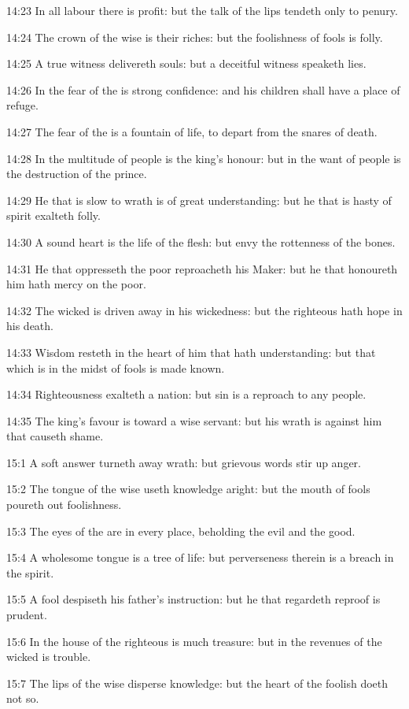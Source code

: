 14:23 In all labour there is profit: but the talk of the lips tendeth
only to penury.

14:24 The crown of the wise is their riches: but the foolishness of
fools is folly.

14:25 A true witness delivereth souls: but a deceitful witness
speaketh lies.

14:26 In the fear of the \LORD is strong confidence: and his children
shall have a place of refuge.

14:27 The fear of the \LORD is a fountain of life, to depart from the
snares of death.

14:28 In the multitude of people is the king's honour: but in the want
of people is the destruction of the prince.

14:29 He that is slow to wrath is of great understanding: but he that
is hasty of spirit exalteth folly.

14:30 A sound heart is the life of the flesh: but envy the rottenness
of the bones.

14:31 He that oppresseth the poor reproacheth his Maker: but he that
honoureth him hath mercy on the poor.

14:32 The wicked is driven away in his wickedness: but the righteous
hath hope in his death.

14:33 Wisdom resteth in the heart of him that hath understanding: but
that which is in the midst of fools is made known.

14:34 Righteousness exalteth a nation: but sin is a reproach to any
people.

14:35 The king's favour is toward a wise servant: but his wrath is
against him that causeth shame.

15:1 A soft answer turneth away wrath: but grievous words stir up
anger.

15:2 The tongue of the wise useth knowledge aright: but the mouth of
fools poureth out foolishness.

15:3 The eyes of the \LORD are in every place, beholding the evil and
the good.

15:4 A wholesome tongue is a tree of life: but perverseness therein is
a breach in the spirit.

15:5 A fool despiseth his father's instruction: but he that regardeth
reproof is prudent.

15:6 In the house of the righteous is much treasure: but in the
revenues of the wicked is trouble.

15:7 The lips of the wise disperse knowledge: but the heart of the
foolish doeth not so.

